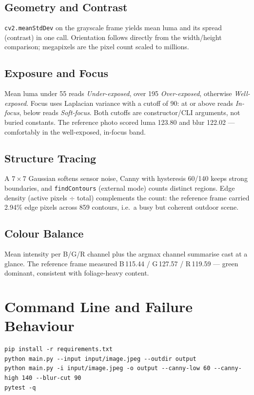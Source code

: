 \documentclass[11pt,a4paper]{article}
\begin{document}
\subsection{Geometry and Contrast}
\texttt{cv2.meanStdDev} on the grayscale frame yields mean luma and its spread
(contrast) in one call. Orientation follows directly from the width/height
comparison; megapixels are the pixel count scaled to millions.

\subsection{Exposure and Focus}
Mean luma under 55 reads \emph{Under-exposed}, over 195
\emph{Over-exposed}, otherwise \emph{Well-exposed}. Focus uses Laplacian
variance with a cutoff of 90: at or above reads \emph{In-focus}, below reads
\emph{Soft-focus}. Both cutoffs are constructor/CLI arguments, not buried
constants. The reference photo scored luma 123.80 and blur 122.02 --- comfortably
in the well-exposed, in-focus band.

\subsection{Structure Tracing}
A $7\times7$ Gaussian softens sensor noise, Canny with hysteresis 60/140 keeps
strong boundaries, and \texttt{findContours} (external mode) counts distinct
regions. Edge density (active pixels $\div$ total) complements the count: the
reference frame carried 2.94\% edge pixels across 859 contours, i.e.\ a busy
but coherent outdoor scene.

\subsection{Colour Balance}
Mean intensity per B/G/R channel plus the argmax channel summarise cast at a
glance. The reference frame measured B\,115.44 / G\,127.57 / R\,119.59 ---
green dominant, consistent with foliage-heavy content.

\section{Command Line and Failure Behaviour}
\begin{lstlisting}[style=shell,caption={Typical invocations}]
pip install -r requirements.txt
python main.py --input input/image.jpeg --outdir output
python main.py -i input/image.jpeg -o output --canny-low 60 --canny-high 140 --blur-cut 90
pytest -q
\end{lstlisting}
\end{document}
